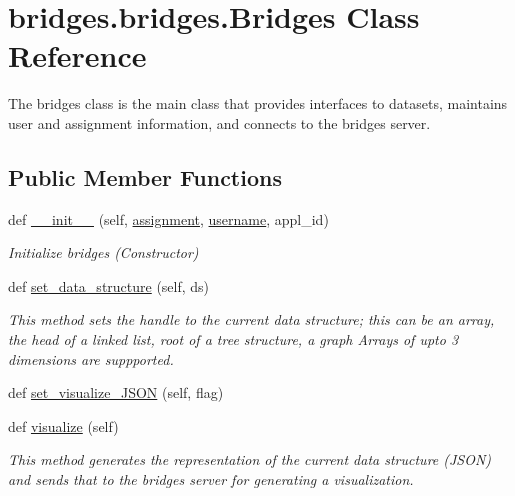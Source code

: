 \hypertarget{classbridges_1_1bridges_1_1_bridges}{}\section{bridges.\+bridges.\+Bridges Class Reference}
\label{classbridges_1_1bridges_1_1_bridges}


The bridges class is the main class that provides interfaces to datasets, maintains user and assignment information, and connects to the bridges server.  


\subsection*{Public Member Functions}
\begin{DoxyCompactItemize}
\item 
def \hyperlink{classbridges_1_1bridges_1_1_bridges_af174072883f6f269a9fe7cc02e12c276}{\+\_\+\+\_\+init\+\_\+\+\_\+} (self, \hyperlink{classbridges_1_1bridges_1_1_bridges_a1a89d732324054f1f349547373c9605c}{assignment}, \hyperlink{classbridges_1_1bridges_1_1_bridges_a492041cbcac828d5a26fcad8515fb221}{username}, appl\+\_\+id)
\begin{DoxyCompactList}\small\item\em Initialize bridges (Constructor) \end{DoxyCompactList}\item 
def \hyperlink{classbridges_1_1bridges_1_1_bridges_a868f02fa66c87c1a1fc7bd6fbc799291}{set\+\_\+data\+\_\+structure} (self, ds)
\begin{DoxyCompactList}\small\item\em This method sets the handle to the current data structure; this can be an array, the head of a linked list, root of a tree structure, a graph Arrays of upto 3 dimensions are suppported. \end{DoxyCompactList}\item 
def \hyperlink{classbridges_1_1bridges_1_1_bridges_ab50d018b5178ca33de24157b7b6de285}{set\+\_\+visualize\+\_\+\+J\+S\+O\+N} (self, flag)
\item 
def \hyperlink{classbridges_1_1bridges_1_1_bridges_a3c1321f8be7b249639a47eba10b67c70}{visualize} (self)
\begin{DoxyCompactList}\small\item\em This method generates the representation of the current data structure (J\+S\+O\+N) and sends that to the bridges server for generating a visualization. \end{DoxyCompactList}\item 

\end{DoxyCompactItemize}
